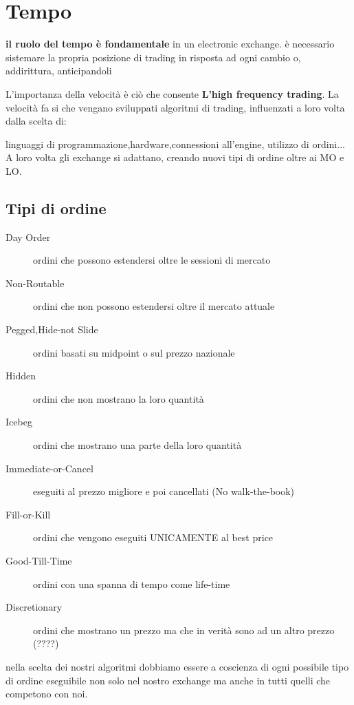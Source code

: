 \documentclass[a4paper,11pt]{report}
\begin{document}
{\section{Tempo}
	\textbf{il ruolo del tempo è fondamentale} in un electronic exchange. \newline
	è necessario sistemare la propria posizione di trading in risposta ad ogni cambio o, addirittura, anticipandoli

	L'importanza della velocità è ciò che consente \textbf{L'high frequency trading}. \newline
	La velocità fa si che vengano sviluppati algoritmi di trading, influenzati a loro volta dalla scelta di:

	 linguaggi di programmazione,hardware,connessioni all'engine, utilizzo di ordini...\newline
	A loro volta gli exchange si adattano, creando nuovi tipi di ordine oltre ai MO e LO.

\newpage

\subsection{Tipi di ordine}
\begin{description}
	\item[Day Order] ordini che possono estendersi oltre le sessioni di mercato
	\item[Non-Routable] ordini che non possono estendersi oltre il mercato attuale
	\item[Pegged,Hide-not Slide] ordini basati su midpoint o sul prezzo nazionale
	\item[Hidden] ordini che non mostrano la loro quantità
	\item[Icebeg] ordini che mostrano una parte della loro quantità
	\item[Immediate-or-Cancel] eseguiti al prezzo migliore e poi cancellati (No walk-the-book)
	\item[Fill-or-Kill] ordini che vengono eseguiti UNICAMENTE al best price
	\item[Good-Till-Time] ordini con una spanna di tempo come life-time
	\item[Discretionary] ordini che mostrano un prezzo ma che in verità sono ad un altro prezzo (????)
\end{description}
	nella scelta dei nostri algoritmi dobbiamo essere a coscienza di ogni possibile tipo di ordine eseguibile non solo nel nostro exchange ma anche in tutti quelli che competono con noi.

}
\end{document}
